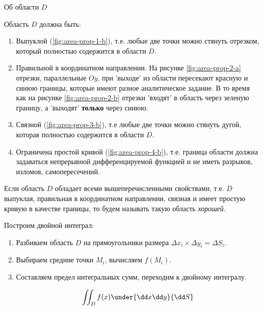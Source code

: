 
\setlength{\columnseprule}{1pt}
\begin{twocolumns}
  
  

  \columnbreak

  
  
\end{twocolumns}
\setlength{\columnseprule}{0pt}

\begin{remark}
  Об области \(D\)

  Область \(D\) должна быть:
  \begin{enumerate}
    \item Выпуклой (\ref{fig:area-prop-1-b}), т.е. любые две точки можно стянуть
    отрезком, который полностью содержится в области \(D\).

    \item Правильной в координатном направлении. На рисунке
    \ref{fig:area-prop-2-a} отрезки, параллельные \(Oy\), при 'выходе' из
    области пересекают красную и синюю границы, которые имеют разное
    аналитическое задание. В то время как на рисунке \ref{fig:area-prop-2-b}
    отрезки 'входят' в область через зеленую границу, а 'выходят'
    \textbf{только} через синюю.

    \item Связной (\ref{fig:area-prop-3-b}), т.е любые две точки можно стянуть
    дугой, которая полностью содержится в области \(D\).

    \item Ограничена простой кривой (\ref{fig:area-prop-4-b}), т.е. граница
    области должна задаваться непрерывной дифференцируемой функцией и не иметь
    разрывов, изломов, самопересечений.
  \end{enumerate}
\end{remark}

\begin{remark}\label{area-good-def}
  Если область \(D\) обладает всеми вышеперечисленными свойствами, т.е. \(D\)
  выпуклая, правильная в координатном направлении, связная и имеет простую
  кривую в качестве границы, то будем называть такую область \textit{хорошей}.
\end{remark}

Построим двойной интеграл:
\begin{enumerate}
  \item Разбиваем область \(D\) на прямоугольники размера
  \(\Delta x_{i} \times \Delta y_{i} = \Delta S_{i}\).

  \item Выбираем средние точки \(M_{i}\), вычисляем \(f(M_{i})\).
  
  \item Составляем предел интегральных сумм, переходим к двойному интегралу.
  
  \begin{align*}
    \iint_{D} f(x) \under{\dd x \dd y}{\dd S}
  \end{align*}
\end{enumerate}

